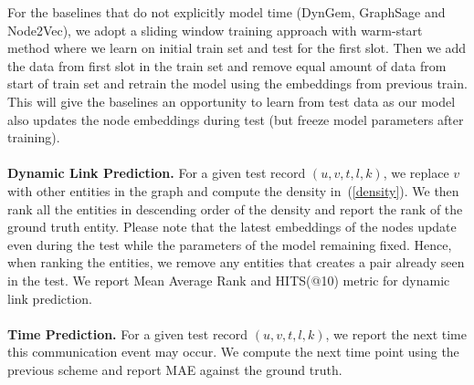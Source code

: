 \documentclass[11pt]{article}
\begin{document}
For the baselines that do not explicitly model time (DynGem, GraphSage and Node2Vec), we adopt a sliding window training approach with warm-start method where we learn on initial train set and test for the first slot. Then we add the data from first slot in the train set and remove equal amount of data from start of train set and retrain the model using the embeddings from previous train. This will give the baselines an opportunity to learn from test data as our model also updates the node embeddings during test (but freeze model parameters after training). 
\\\\ 
{\bf Dynamic Link Prediction.} For a given test record $(u, v, t, l, k)$, we replace $v$ with other entities in the graph and compute the density in~(\ref{density}). We then rank all the entities in descending order of the density and report the rank of the ground truth entity. Please note that the latest embeddings of the nodes update even during the test while the parameters of the model remaining fixed. Hence, when ranking the entities, we remove any entities that creates a pair already seen in the test.
We report Mean Average Rank and HITS(@10) metric for dynamic link prediction.\\\\ 
{\bf Time Prediction.} For a given test record $(u, v, t, l, k)$, we report the next time this communication event may occur. We compute the next time point using the previous scheme and report MAE against the ground truth.
\end{document}

